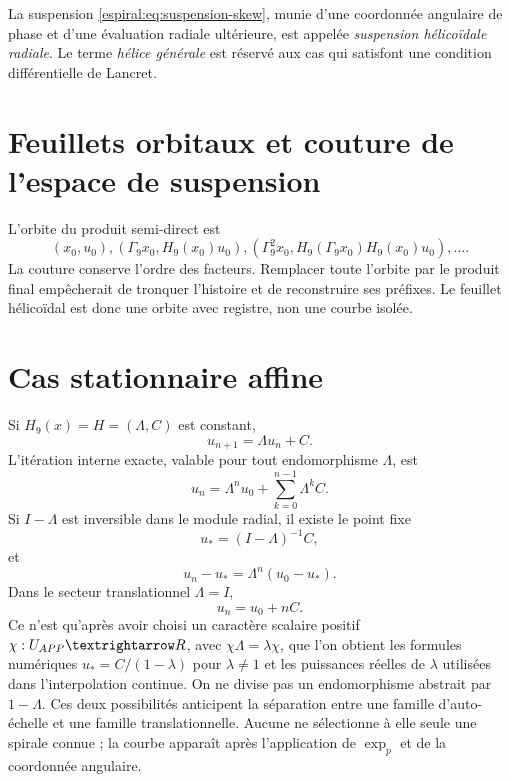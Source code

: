 \begin{definition}
La suspension \cref{espiral:eq:suspension-skew}, munie d'une coordonnée angulaire de phase et d'une évaluation radiale ultérieure, est appelée \emph{suspension hélicoïdale radiale}. Le terme \emph{hélice générale} est réservé aux cas qui satisfont une condition différentielle de Lancret.
\end{definition}

\section{Feuillets orbitaux et couture de l'espace de suspension}

L'orbite du produit semi-direct est
\[
 (x_0,u_0),
 (\Gamma_9x_0,H_9(x_0)u_0),
 (\Gamma_9^2x_0,H_9(\Gamma_9x_0)H_9(x_0)u_0),\ldots.
\]
La couture conserve l'ordre des facteurs. Remplacer toute l'orbite par le produit final empêcherait de tronquer l'histoire et de reconstruire ses préfixes. Le feuillet hélicoïdal est donc une orbite avec registre, non une courbe isolée.

\section{Cas stationnaire affine}

Si \(H_9(x)=H=(\Lambda,C)\) est constant,
\[
 u_{n+1}=\Lambda u_n+C.
\]
L'itération interne exacte, valable pour tout endomorphisme \(\Lambda\), est
\begin{equation}
 u_n=\Lambda^n u_0+\sum_{k=0}^{n-1}\Lambda^kC.
 \label{espiral:eq:orbita-afin-estacionaria-general}
\end{equation}
Si \(I-\Lambda\) est inversible dans le module radial, il existe le point fixe
\[
 u_*=(I-\Lambda)^{-1}C,
\]
et
\begin{equation}
 u_n-u_*=\Lambda^n(u_0-u_*).
 \label{espiral:eq:orbita-afin-estacionaria}
\end{equation}
Dans le secteur translationnel \(\Lambda=I\),
\[
 u_n=u_0+nC.
\]
Ce n'est qu'après avoir choisi un caractère scalaire positif \(\chi:U_{\APP}\to\R\), avec \(\chi\Lambda=\lambda\chi\), que l'on obtient les formules numériques \(u_*=C/(1-\lambda)\) pour \(\lambda\neq1\) et les puissances réelles de \(\lambda\) utilisées dans l'interpolation continue. On ne divise pas un endomorphisme abstrait par \(1-\Lambda\).
Ces deux possibilités anticipent la séparation entre une famille d'auto-échelle et une famille translationnelle. Aucune ne sélectionne à elle seule une spirale connue ; la courbe apparaît après l'application de \(\exp_p\) et de la coordonnée angulaire.

